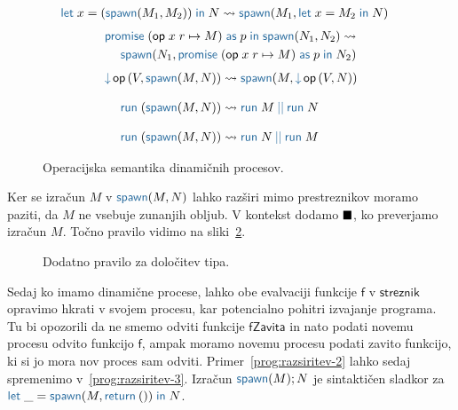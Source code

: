 \begin{figure}[H]
	\centering
	\small
	\begin{align*}
	\tmlet{x}{(\tmspawn{M_1}{M_2})}{N} & \reduces \tmspawn{M_1}{\tmlet{x}{M_2}{N}}
	\end{align*}
	\vspace{-5ex}
	\begin{align*}
	\tmwithrec{op}{x}{r}{M}{p}{\tmspawn{N_1}{N_2}} \reduces \\
	\tmspawn{N_1}{\tmwithrec{op}{x}{r}{M}{p}{N_2}}
	\end{align*}
	\vspace{-5ex}
	\begin{align*}
	\tmopin{op}{V}{\tmspawn{M}{N}} & \reduces \tmspawn{M}{\tmopin{op}{V}{N}}
	\razmik
	\tmrun{(\tmspawn{M}{N})} & \reduces \tmpar{\tmrun{M}}{\tmrun{N}}
	\razmik
	\tmrun{(\tmspawn{M}{N})} & \reduces \tmpar{\tmrun{N}}{\tmrun{M}}
	\end{align*}
	
	\caption{Operacijska semantika dinamičnih procesov.}
	\label{fig:semantika-spawn}
\end{figure}

Ker se izračun $M$ v $\tmspawn{M}{N}$ lahko razširi mimo prestreznikov moramo paziti, da $M$ ne vsebuje zunanjih obljub. V kontekst dodamo $\bb$, ko preverjamo izračun $M$. Točno pravilo vidimo na sliki~\ref{fig:tipi-pravila-spawn}.

\begin{figure}[H]
	\centering
	\small
	\begin{mathpar}
	\end{mathpar}
	\vspace{-5ex}
	\caption{Dodatno pravilo za določitev tipa.}
	\label{fig:tipi-pravila-spawn}
\end{figure}


Sedaj ko imamo dinamične procese, lahko obe evalvaciji funkcije $\mathsf{f}$ v $\mathsf{streznik}$ opravimo hkrati v svojem procesu, kar potencialno pohitri izvajanje programa. 
Tu bi opozorili da ne smemo odviti funkcije $\mathsf{fZavita}$ in nato podati novemu procesu odvito funkcijo $\mathsf{f}$, ampak moramo novemu procesu podati zavito funkcijo, ki si jo mora nov proces sam odviti. 
Primer~\ref{prog:razsiritev-2} lahko sedaj spremenimo v~\ref{prog:razsiritev-3}.
Izračun $\tmkw{spawn}(M);N$ je sintaktičen sladkor za $\tmlet{\_}{\tmspawn{M}{\tmreturn{()}}}{N}$. 


